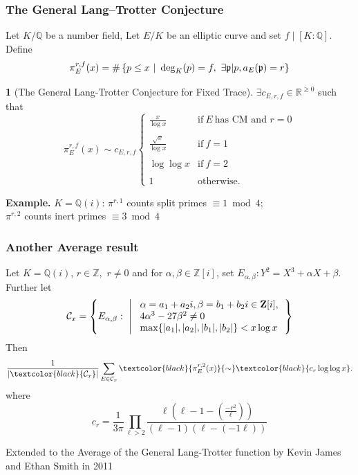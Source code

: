 \documentclass[10pt,handout]{beamer} %
\newcommand{\Q}{\mathbb Q}
\newcommand{\Z}{\mathbb Z}
\newcommand{\R}{\mathbb R}
\theoremstyle{definition}
\newtheorem{conj}[theorem]{\translate{Conjecture}}
\begin{document}
\begin{frame}
\frametitle{The General Lang--Trotter Conjecture}\pause

\begin{definition}\pause
Let $K/\Q$ be a number field, Let $E/K$ be an elliptic curve and set $f\mid [K:\Q]$. Define
$$\pi_E^{r,f}(x)=\#\left\{p\leq x\ |\ \deg_K(p)=f,\ \exists \mathfrak p|p, a_E(\mathfrak p)=r\right\}\vspace*{-13pt}$$
 \end{definition}\pause


\begin{conj}[The General Lang-Trotter Conjecture for Fixed Trace]\pause
$\exists c_{E,r,f}\in\R^{\geq0}$ such that\vspace*{-5pt}
$$\displaystyle{\pi_E^{r,f}(x)\sim c_{E,r,f} \begin{cases} \frac{x}{\log x}& \textrm{if}\ E\
\textrm{has CM and } r=0\\ \\
\frac{\sqrt{x}}{\log x}  & \textrm{if}\ f=1 \\ \\
\log\log x & \textrm{if}\ f=2\\ \\
1 & \textrm{otherwise.}
\end{cases}}$$\vspace*{-5pt}
 \end{conj}\pause
 

{\bf Example.} $K=\Q(i)$: $\pi^{r,1}$ counts split primes $\equiv1\bmod4$;\\
\hspace*{3.2cm}$\pi^{r,2}$ counts inert primes $\equiv3\bmod4$
\end{frame}

\begin{frame}
\frametitle{Another Average result}

\begin{theorem}[C. David \& F.P. (2004)]\pause Let
$K=\Q(i)$, $r\in\mathbb Z,$ $r\neq 0$ and for $\alpha,\beta\in\Z[i]$, set
$E_{\alpha,\beta}: Y^2=X^3+\alpha X+\beta$. \pause Further let
$${\cal C}_x= \left\{ E_{\alpha,\beta}:  \ \left|\
\begin{array}{l}\alpha=a_1+a_2i,\beta=b_1+b_2i\in{\bf Z}[i],\\
 4\alpha^3-27\beta^2\neq0 \\
\max\{|a_1|,|a_2|,|b_1|,|b_2|\}<x\log x
\end{array}
    \right.\right\}$$ \pause    
Then
$$\frac1{|\textcolor{black}{{\cal
C}_x}|}\sum_{{E\in{\cal C}_x}}
\textcolor{black}{\pi_E^{r,2}(x)}{\sim}\textcolor{black}{
c_{r}\log\log x}.$$\pause
where
$$c_{r}=\frac1{3\pi}
\prod_{\ell>2}\frac{\ell(\ell-1-\left(\frac{-r^2}{\ell}\right))}{
(\ell-1)(\ell-\left({-1}{\ell}\right))}$$
\end{theorem}

Extended to the Average of the General Lang-Trotter function by Kevin James and Ethan Smith in 2011


\end{frame}
\end{document}
